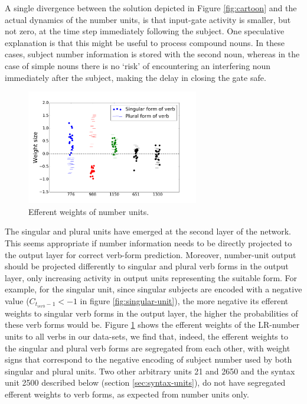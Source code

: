 A single divergence between the solution depicted in Figure \ref{fig:cartoon} and the actual dynamics of the number units, is that input-gate activity is smaller, but not zero, at the time step immediately following the subject. One speculative explanation is that this might be useful to process compound nouns. In these cases, subject number information is stored with the second noun, whereas in the case of simple nouns there is no `risk' of encountering an interfering noun immediately after the subject, making the delay in closing the gate safe.

\begin{figure}[b]
    \centering
    \includegraphics[height=5cm]{Figures/weight_dists_verbs.png}
    \caption{Efferent weights of number units.}
    \label{fig:output-weights}
\end{figure}

The singular and plural units have emerged at the second layer of the network. This seems appropriate if number information needs to be directly projected to the output layer for correct verb-form prediction. Moreover, number-unit output should be projected differently to singular and plural verb forms in the output layer, only increasing activity in output units representing the suitable form. For example, for the singular unit, since singular subjects are encoded with a negative value ($C_{t_{verb}-1}<-1$ in figure \ref{fig:singular-unit}), the more negative its efferent weights to singular verb forms in the output layer, the higher the probabilities of these verb forms would be. Figure \ref{fig:output-weights} shows the efferent weights of the LR-number units to all verbs in our data-sets, we find that, indeed, the efferent weights to the singular and plural verb forms are segregated from each other, with weight signs that correspond to the negative encoding of subject number used by both singular and plural units. Two other arbitrary units \unit{2}{1} and \unit{2}{650} and the syntax unit \unit{2}{500} described below (section \ref{sec:syntax-units}), do not have segregated efferent weights to verb forms, as expected from number units only. 

